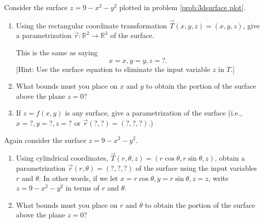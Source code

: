 \begin{problem}\label{3d parametric plot}
%
 Consider the surface $z=9-x^2-y^2$ plotted in problem \ref{prob:3dsurface plot}.
\begin{enumerate}
 \item 
Using the rectangular coordinate transformation $\vec T(x,y,z)=(x,y,z)$, give a parametrization $\vec r\colon \mathbb{R}^2\to\mathbb{R}^3$ of the surface. 

This is the same as saying $$x=x, y=y, z=?.$$
[Hint: Use the surface equation to eliminate the input variable $z$ in $T$.]

 \item What bounds must you place on $x$ and $y$ to obtain the portion of the surface above the plane $z=0$?
 \item If $z=f(x,y)$ is any surface, give a parametrization of the surface (i.e., $x=?, y=?, z=?$ or $\vec r (?,?)=(?,?,?)$.)
\end{enumerate}

\end{problem}
\begin{problem}%
%
 Again consider the surface $z=9-x^2-y^2$.
\begin{enumerate}
 \item
Using cylindrical coordinates, $\vec T(r,\theta,z) = (r\cos \theta, r\sin\theta, z)$, obtain a parametrization $\vec r(r,\theta)=(?,?,?)$ of the surface using the input variables $r$ and $\theta$. In other words, if we let $x=r\cos \theta, y=r\sin\theta, z=z$, write $z=9-x^2-y^2$ in terms of $r$ and $\theta$.
 \item What bounds must you place on $r$ and $\theta$ to obtain the portion of the surface above the plane $z=0$?
\end{enumerate}

\end{problem}


